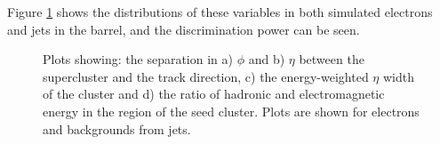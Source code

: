 Figure \ref{fig:electronID} shows the distributions of these variables in both simulated
electrons and jets in the barrel, and the discrimination power can be seen.

\begin{figure}
\begin{center}

\end{center}
\caption{
    Plots showing: the separation in a) $\phi$ and b) $\eta$ between the supercluster and the
    track direction, c) the energy-weighted $\eta$ width of the cluster and d)
    the ratio of hadronic and electromagnetic energy in the region of the seed
    cluster. Plots are shown for electrons and backgrounds from jets. 
}
\label{fig:electronID}
\end{figure} 

